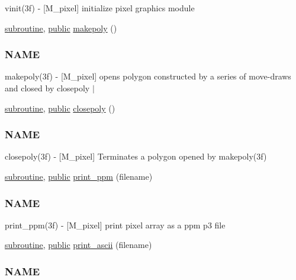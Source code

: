 \begin{DoxyCompactItemize}
\begin{DoxyCompactList}
vinit(3f) -\/ \mbox{[}M\+\_\+pixel\mbox{]} initialize pixel graphics module \end{DoxyCompactList}\item 
\hyperlink{M__stopwatch_83_8txt_acfbcff50169d691ff02d4a123ed70482}{subroutine}, \hyperlink{M__stopwatch_83_8txt_a2f74811300c361e53b430611a7d1769f}{public} \hyperlink{namespacem__pixel_ab7128437f95b40004bf73fc6e3f597f8}{makepoly} ()
\begin{DoxyCompactList}\small\item\em \subsubsection*{N\+A\+ME}

makepoly(3f) -\/ \mbox{[}M\+\_\+pixel\mbox{]} opens polygon constructed by a series of move-\/draws and closed by closepoly $\vert$ \end{DoxyCompactList}\item 
\hyperlink{M__stopwatch_83_8txt_acfbcff50169d691ff02d4a123ed70482}{subroutine}, \hyperlink{M__stopwatch_83_8txt_a2f74811300c361e53b430611a7d1769f}{public} \hyperlink{namespacem__pixel_ab3dc83b63d2ab1bf3f63932abca4245d}{closepoly} ()
\begin{DoxyCompactList}\small\item\em \subsubsection*{N\+A\+ME}

closepoly(3f) -\/ \mbox{[}M\+\_\+pixel\mbox{]} Terminates a polygon opened by makepoly(3f) \end{DoxyCompactList}\item 
\hyperlink{M__stopwatch_83_8txt_acfbcff50169d691ff02d4a123ed70482}{subroutine}, \hyperlink{M__stopwatch_83_8txt_a2f74811300c361e53b430611a7d1769f}{public} \hyperlink{namespacem__pixel_a01797b04ce7c693c3fd6a841e8d1de48}{print\+\_\+ppm} (filename)
\begin{DoxyCompactList}\small\item\em \subsubsection*{N\+A\+ME}

print\+\_\+ppm(3f) -\/ \mbox{[}M\+\_\+pixel\mbox{]} print pixel array as a ppm p3 file \end{DoxyCompactList}\item 
\hyperlink{M__stopwatch_83_8txt_acfbcff50169d691ff02d4a123ed70482}{subroutine}, \hyperlink{M__stopwatch_83_8txt_a2f74811300c361e53b430611a7d1769f}{public} \hyperlink{namespacem__pixel_ab2bb47aea567667b1b92c8265bcb36fb}{print\+\_\+ascii} (filename)
\begin{DoxyCompactList}\small\item\em \subsubsection*{N\+A\+ME}


\end{DoxyCompactList}
\end{DoxyCompactItemize}
